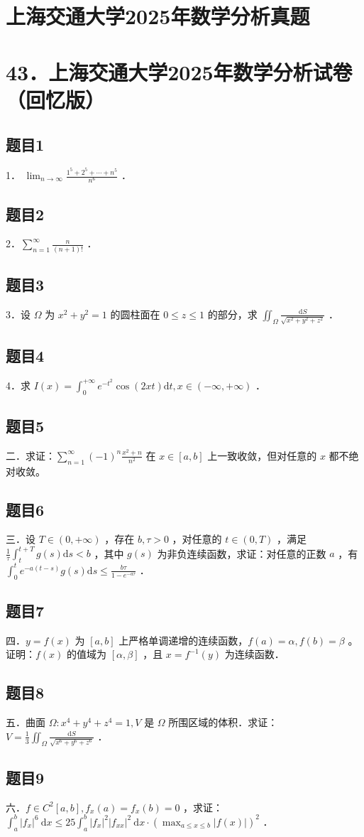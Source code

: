 \documentclass{article}
\begin{document}
\section*{上海交通大学2025年数学分析真题}
\section*{43．上海交通大学2025年数学分析试卷（回忆版）}
\subsection{题目1}
1． \(\lim _{n \rightarrow \infty} \frac{1^{5}+2^{5}+\cdots+n^{5}}{n^{6}}\) ．
\subsection{题目2}
2．\(\sum_{n=1}^{\infty} \frac{n}{(n+1)!}\) ．
\subsection{题目3}
3．设 \(\Omega\) 为 \(x^{2}+y^{2}=1\) 的圆柱面在 \(0 \leq z \leq 1\) 的部分，求 \(\iint_{\Omega} \frac{\mathrm{d} S}{\sqrt{x^{2}+y^{2}+z^{2}}}\) ．
\subsection{题目4}
4．求 \(I(x)=\int_{0}^{+\infty} e^{-t^{2}} \cos (2 x t) \mathrm{d} t, x \in(-\infty,+\infty)\) ．
\subsection{题目5}
二．求证：\(\sum_{n=1}^{\infty}(-1)^{n} \frac{x^{2}+n}{n^{2}}\) 在 \(x \in[a, b]\) 上一致收敛，但对任意的 \(x\) 都不绝对收敛。
\subsection{题目6}
三．设 \(T \in(0,+\infty)\) ，存在 \(b, \tau>0\) ，对任意的 \(t \in(0, T)\) ，满足 \(\frac{1}{\tau} \int_{t}^{t+T} g(s) \mathrm{d} s<b\) ，其中 \(g(s)\) 为非负连续函数，求证：对任意的正数 \(a\) ，有 \(\int_{0}^{t} e^{-a(t-s)} g(s) \mathrm{d} s \leq \frac{b \tau}{1-e^{-a \tau}}\) ．
\subsection{题目7}
四．\(y=f(x)\) 为 \([a, b]\) 上严格单调递增的连续函数，\(f(a)=\alpha, f(b)=\beta\) 。证明：\(f(x)\) 的值域为 \([\alpha, \beta]\) ，且 \(x=f^{-1}(y)\) 为连续函数．
\subsection{题目8}
五．曲面 \(\Omega: x^{4}+y^{4}+z^{4}=1, V\) 是 \(\Omega\) 所围区域的体积．求证：\(V=\frac{1}{3} \iint_{\Omega} \frac{\mathrm{d} S}{\sqrt{x^{6}+y^{6}+z^{6}}}\) ．
\subsection{题目9}
六．\(f \in C^{2}[a, b], f_{x}(a)=f_{x}(b)=0\) ，求证： \(\int_{a}^{b}\left|f_{x}\right|^{6} \mathrm{~d} x \leq 25 \int_{a}^{b}\left|f_{x}\right|^{2}\left|f_{x x}\right|^{2} \mathrm{~d} x \cdot\left(\max _{a \leq x \leq b}|f(x)|\right)^{2}\) ．
\end{document}
